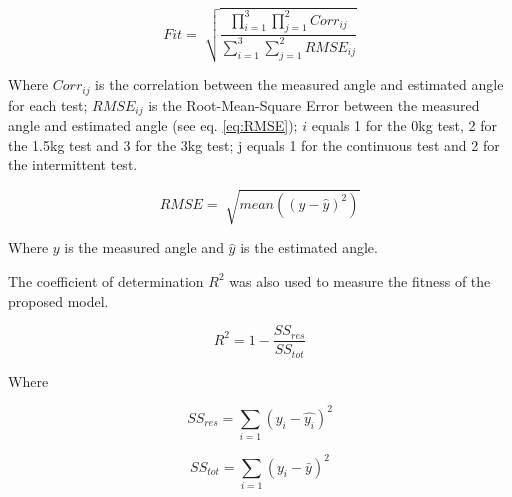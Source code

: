 \documentclass[letterpaper, 10 pt, conference]{ieeeconf}  %
\begin{document}

\begin{equation}
\label{eq:fitness}
Fit = \sqrt[]{\frac{\prod_{i=1}^{3}\prod_{j=1}^{2} Corr_{ij}}{\sum_{i=1}^{3}\sum_{j=1}^{2} RMSE_{ij}}}
\end{equation}

Where $Corr_{ij}$ is the correlation between the measured angle and estimated angle for each test; $RMSE_{ij}$ is the Root-Mean-Square Error between the measured angle and estimated angle (see eq. \ref{eq:RMSE}); $i$ equals 1 for the 0kg test, 2 for the 1.5kg test and 3 for the 3kg test; j equals 1 for the continuous test and 2 for the intermittent test.

\begin{equation}
\label{eq:RMSE}
RMSE = \sqrt[]{mean((y-\hat{y})^2)}
\end{equation}


Where $y$ is the measured angle and $\hat{y}$ is the estimated angle.

The coefficient of determination $R^2$ was also used to measure the fitness of the proposed model.

\begin{equation}
\label{eq:coeffDet}
R^2 = 1 - \frac{SS_{res}}{SS_{tot}}
\end{equation}

Where

\begin{equation}
\label{eq:SSres}
SS_{res} = \sum_{i=1}(y_i-\hat{y_i})^2
\end{equation}

\begin{equation}
\label{eq:SStot}
SS_{tot} = \sum_{i=1}(y_i-\bar{y})^2
\end{equation}
\end{document}
